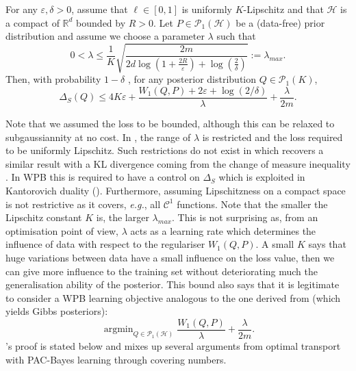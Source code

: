 \begin{theorem}
\label{th: compact_catoni}
For any $\varepsilon,\delta>0$, assume that $\ell\in [0,1]$ is uniformly $K$-Lipschitz and that $\mathcal{H}$ is a compact of $\mathbb{R}^d$ bounded by $R>0$. Let $P\in \mathcal{P}_1(\mathcal{H})$ be a (data-free) prior distribution and assume we choose a parameter $\lambda$ such that
\[ 0< \lambda \leq  \frac{1}{K}\sqrt{\frac{2m}{2d\log(1+\frac{2R}{\varepsilon})+\log(\frac{2}{\delta})}}:= \lambda_{max}. \]
Then, with probability $1-\delta$ , for any posterior distribution $Q\in\mathcal{P}_1(K)$,
\[ \Delta_S(Q) \leq 4K\varepsilon + \frac{W_1(Q,P)+2\varepsilon +\log(2/\delta)}{\lambda} + \frac{\lambda}{2m}.   \]
\end{theorem}
Note that we assumed the loss to be bounded, although this can be relaxed to subgaussiannity at no cost.
In , the range of $\lambda$ is restricted and the loss required to be uniformly Lipschitz. Such restrictions do not exist in \citet[Theorem 4.1]{alquier2016properties} which recovers a similar result with a KL divergence coming from the change of measure inequality \citep{donsker1976asymp}. In WPB this is required to have a control on $\Delta_S$ which is exploited in Kantorovich duality ().
Furthermore, assuming Lipschitzness on a compact space is not restrictive as it covers, \emph{e.g.}, all $\mathcal{C}^1$ functions.
Note that the smaller the Lipschitz constant $K$ is, the larger $\lambda_{max}$.
This is not surprising as, from an optimisation point of view, $\lambda$ acts as a learning rate which determines the influence of data with respect to the regulariser $W_1(Q,P)$.
A small $K$ says that huge variations between data have a small influence on the loss value, then we can give more influence to the training set without deteriorating much the generalisation ability of the posterior.
This bound also says that it is legitimate to consider a WPB learning objective analogous to the one derived from \citet[Theorem 4.1]{alquier2016properties} (which yields Gibbs posteriors):
$$\operatorname{argmin}_{Q\in\mathcal{P}_1(\mathbb{\mathcal{H}})}\frac{W_1(Q,P)}{\lambda} + \frac{\lambda}{2m}.$$
's proof is stated below and mixes up several arguments from optimal transport with PAC-Bayes learning through covering numbers.
